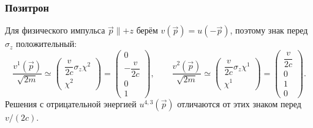 \documentclass[../final.tex]{subfiles}
\begin{document}
\subsubsection*{Позитрон}

Для физического импульса $\vec p\parallel +z$ берём $v(\vec p)=u(-\vec p)$,
поэтому знак перед $\sigma_z$ положительный:
\begin{equation*}
    \frac{v^{1}(\vec p)}{\sqrt{2m}}
    \simeq
    \begin{pmatrix}
        \dfrac{v}{2c}\sigma_z\chi^2\\[0.4em]
        \chi^2
    \end{pmatrix}
    =
    \begin{pmatrix}
        0\\ -\dfrac{v}{2c}\\0\\1
    \end{pmatrix},
    \qquad
    \frac{v^{2}(\vec p)}{\sqrt{2m}}
    \simeq
    \begin{pmatrix}
        \dfrac{v}{2c}\sigma_z\chi^1\\[0.4em]
        \chi^1
    \end{pmatrix}
    =
    \begin{pmatrix}
        \dfrac{v}{2c}\\0\\1\\0
    \end{pmatrix}.
\end{equation*}
Решения с отрицательной энергией $u^{4,3}(\vec p)$ отличаются от этих
знаком перед $v/(2c)$.

\end{document}
